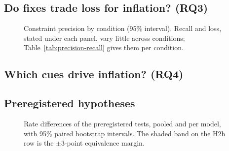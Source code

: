 
\subsection{Do fixes trade loss for inflation? (RQ3)}

\begin{table}[t]
  \centering\small
  \caption{Constraint precision, recall and loss rate by condition (\%).}
  \label{tab:precision-recall}
\end{table}

\begin{figure}[t]
  \centering
  \caption{Constraint precision by condition (95\% interval). Recall and loss, stated under each
  panel, vary little across conditions; Table~\ref{tab:precision-recall} gives them per condition.}
  \label{fig:precision}
\end{figure}


\subsection{Which cues drive inflation? (RQ4)}

\begin{table}[t]
  \centering\small
  \caption{Mixed-effects logistic regression of item-level inflation.}
  \label{tab:regression-items}
\end{table}


\subsection{Preregistered hypotheses}

\begin{table}[t]
  \centering\small
  \caption{Preregistered tests H1--H5 (Holm family of ten) and the H2b equivalence test, pooled
  over models: rate difference in percentage points with its 95\% paired bootstrap interval,
  odds ratio from the mixed-effects regression, Holm-adjusted $p$ and verdict.}
  \label{tab:hypotheses}
\end{table}

\begin{figure}[t]
  \centering
  \caption{Rate differences of the preregistered tests, pooled and per model, with 95\% paired
  bootstrap intervals. The shaded band on the H2b row is the $\pm 3$-point equivalence margin.}
  \label{fig:hypotheses}
\end{figure}

